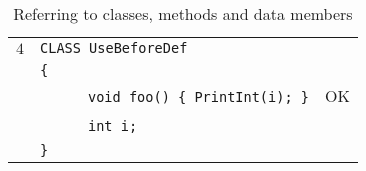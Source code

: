 \documentclass{article}
\begin{document}
\begin{table}[h]
\begin{tabular}{|l|l|l|}
\hline
 $4$ & \verb"CLASS UseBeforeDef"                 &    \\
     & \verb"{"                                  &    \\
     & ~ ~ ~ ~\verb"void foo() { PrintInt(i); }" & OK \\
     & ~ ~ ~ ~\verb"int i;"                      &    \\
     & \verb"}"                                  &    \\
\hline
\end{tabular}
\caption{Referring to classes, methods and data members
\label{Table_Code_Examples_Use_Before_Def}}
\end{table}
\newpage
\end{document}
